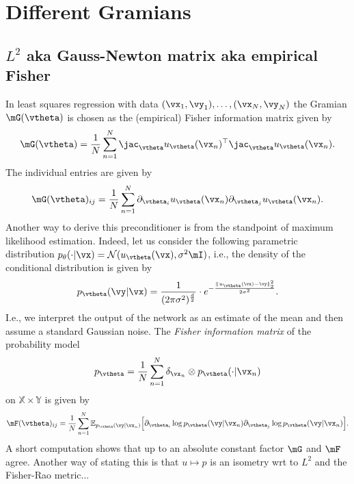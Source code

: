 \section{Different Gramians}

\subsection{$L^2$ aka Gauss-Newton matrix aka empirical Fisher}

In least squares regression with data $(\vx_1, \vy_1), \dots, (\vx_N, \vy_N)$ the Gramian $\mG(\vtheta)$ is chosen as the (empirical) Fisher information matrix given by~\citep{martens2020new, eschenhagen2023kroneckerfactored}
\begin{equation}
  \mG(\vtheta) = \frac1N\sum_{n=1}^N \jac_{\vtheta} u_{\vtheta}(\vx_n)^\top \jac_{\vtheta} u_{\vtheta}(\vx_n).
 \end{equation}
 The individual entries are given by
\begin{equation}
  \mG(\vtheta)_{ij} = \frac1N\sum_{n=1}^N \partial_{\vtheta_i} u_{\vtheta}(\vx_n) \partial_{\vtheta_j} u_{\vtheta}(\vx_n).
\end{equation}
Another way to derive this preconditioner is from the standpoint of maximum likelihood estimation.
Indeed, let us consider the following parametric distribution $p_\theta(\cdot|\vx) = \mathcal N(u_\vtheta(\vx), \sigma^2\mI)$, i.e., the density of the conditional distribution is given by
\begin{align}
    p_\vtheta(\vy|\vx) = \frac1{(2\pi\sigma^2)^{\frac{d}2}} \cdot e^{-\frac{\lVert u_\vtheta(\vx) - \vy \rVert_2^2}{2\sigma^2}}.
\end{align}
I.e., we interpret the output of the network as an estimate of the mean and then assume a standard Gaussian noise.
The \emph{Fisher information matrix} of the probability model
\begin{align}
    p_\vtheta = \frac1N \sum_{n=1}^N \delta_{\vx_n}\otimes p_\vtheta(\cdot|\vx_n)
\end{align}
on $\mathbb X\times\mathbb Y$ is given by
\begin{align}
    {\mF}(\vtheta)_{ij} = \frac1N\sum_{n=1}^N  \mathbb E_{p_\vtheta(\vy|\vx_n)}\Big[\partial_{\vtheta_i} \log p_{\vtheta}(\vy|\vx_n) \partial_{\vtheta_j} \log p_{\vtheta}(\vy|\vx_n)\Big].
\end{align}
A short computation shows that up to an absolute constant factor $\mG$ and ${\mF}$ agree.
Another way of stating this is that $u\mapsto p$ is an isometry wrt to $L^2$ and the Fisher-Rao metric...
\todo{}

